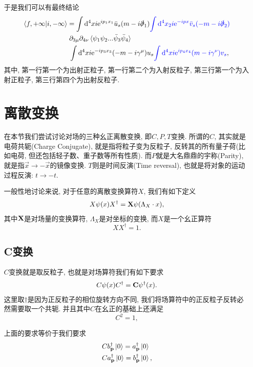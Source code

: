 于是我们可以有最终结论
\begin{align}
    \braket{f, +\infty|i, -\infty}&=\int\mathrm d^4xi\mathrm e^{ip_1x_1}\bar u_s(m-i\slashed\partial_1)\textcolor{blue}{\int\mathrm d^4x_2i\mathrm e^{-ipx}\bar v_s(-m-i\slashed\partial_2)}\notag\\
    &\;\partial_{3\mu}\partial_{4\nu}\braket{\psi_1\psi_2...\bar\psi_3\bar\psi_4}\notag\\
    &\;\int\mathrm d^4xi\mathrm e^{-ip_3x_3}(-m-i\gamma^\mu)u_s\textcolor{blue}{\int\mathrm d^4xi\mathrm e^{ip_4x_4}(m-i\gamma^\nu)v_s},
\end{align}
其中, 第一行第一个为出射正粒子, 第一行第二个为入射反粒子, 第三行第一个为入射正粒子, 第三行第四个为出射反粒子.

\newpage
\section{离散变换}
在本节我们尝试讨论对场的三种幺正离散变换, 即$C,P,T$变换. 所谓的$C$, 其实就是电荷共轭(Charge Conjugate), 就是指将粒子变为反粒子, 反转其的所有量子荷(比如电荷, 但还包括轻子数、重子数等所有性质). 而$P$就是大名鼎鼎的宇称(Parity), 就是指$\vec x\to-\vec x$的镜像变换. $T$则是时间反演(Time reversal), 也就是将对象的运动过程反演: $t\to-t$. 

一般性地讨论来说, 对于任意的离散变换算符$X$, 我们有如下定义
\begin{equation}
    X\psi(x)X^\dagger=\boldsymbol{\mathrm{X}}\psi(\Lambda_X\cdot x),
\end{equation}
其中$\boldsymbol{\mathrm{X}}$是对场量的变换算符, $\Lambda_X$是对坐标的变换, 而$X$是一个幺正算符
\begin{equation}
    XX^\dagger=1.
\end{equation}

\subsection{C变换}
$C$变换就是取反粒子, 也就是对场算符我们有如下要求
\begin{equation}
    C\psi(x)C^\dagger=\boldsymbol{\mathrm{C}}\psi^\dagger(x).
\end{equation}
这里取$\dagger$是因为正反粒子的相位旋转方向不同, 我们将场算符中的正反粒子反转必然需要取一个共轭. 并且其中$C$在幺正的基础上还满足
\begin{equation}
    C^2=1, 
\end{equation}


上面的要求等价于我们要求
\begin{align}
    & Cb_{\mathbf{p}}^\dagger\ket0=a_{\mathbf{p}}^\dagger\ket 0\\
    & Ca_{\mathbf{p}}^\dagger\ket0=b_{\mathbf{p}}^\dagger\ket 0,
\end{align}

